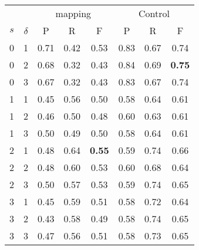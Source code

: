 \begin{table}[htb]
{\begin{tabular}{cc|ccc|ccc}
\multicolumn{2}{c}{} & \multicolumn{3}{c}{\footnotesize{mapping}} & \multicolumn{3}{c}{Control} \\
$s$ & $\delta$ & P & R & F & P & R & F\\ \hline\hline
0 & 1 & 0.71 & 0.42 & 0.53 & 0.83 & 0.67 & 0.74 \\
0 & 2 & 0.68 & 0.32 & 0.43 & 0.84 & 0.69 & \textbf{0.75} \\
0 & 3 & 0.67 & 0.32 & 0.43 & 0.83 & 0.67 & 0.74 \\ \hline
1 & 1 & 0.45 & 0.56 & 0.50 & 0.58 & 0.64 & 0.61 \\
1 & 2 & 0.46 & 0.50 & 0.48 & 0.60 & 0.63 & 0.61 \\
1 & 3 & 0.50 & 0.49 & 0.50 & 0.58 & 0.64 & 0.61 \\ \hline
2 & 1 & 0.48 & 0.64 & \textbf{0.55} & 0.59 & 0.74 & 0.66 \\
2 & 2 & 0.48 & 0.60 & 0.53 & 0.60 & 0.68 & 0.64 \\
2 & 3 & 0.50 & 0.57 & 0.53 & 0.59 & 0.74 & 0.65 \\ \hline
3 & 1 & 0.45 & 0.59 & 0.51 & 0.58 & 0.72 & 0.64 \\
3 & 2 & 0.43 & 0.58 & 0.49 & 0.58 & 0.74 & 0.65 \\
3 & 3 & 0.47 & 0.56 & 0.51 & 0.58 & 0.73 & 0.65 \\
\end{tabular}
}
\end{table}
